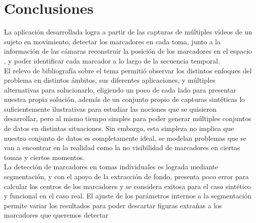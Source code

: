 \section{Conclusiones}



La aplicación desarrollada logra a partir de las capturas de múltiples vídeos de un sujeto en movimiento, detectar los marcadores en cada toma, junto a la información de las cámaras reconstruir la posición de los marcadores en el espacio , y poder identificar cada marcador a lo largo de la secuencia temporal.
\\ 

El relevo de bibliografía sobre el tema permitió observar los distintos enfoques del problema en distintos ámbitos, sus diferentes aplicaciones, y múltiples alternativas para solucionarlo, eligiendo un poco de cada lado para presentar nuestra propia solución, además de un conjunto propio de capturas sintéticas lo suficientemente ilustrativas para estudiar las nociones que se quisieron desarrollar, pero al mismo tiempo simples para poder generar múltiples conjuntos de datos en distintas situaciones. Sin embargo, esta simpleza no implica que nuestro conjunto de datos es completamente ideal, se modelan problemas que se van a encontrar en la realidad como la no visibilidad de marcadores en ciertas tomas y ciertos momentos.
\\ 

La detección de marcadores en tomas individuales es lograda mediante segmentación, y con el apoyo de la extracción de fondo, presenta poco error para calcular los centros de los marcadores y se considera exitosa para el caso sintético y funcional en el caso real. El ajuste de los parámetros internos a la segmentación permite variar los resultados para poder descartar figuras extrañas a los marcadores que queremos detectar
\\ 

